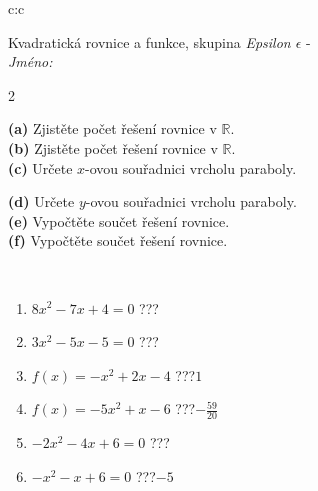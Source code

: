 \documentclass[10pt]{report}
\begin{document}
\begin{tabular}{c:c}
\begin{minipage}[c][104.5mm][t]{0.5\linewidth}
\begin{center}
\vspace{7mm}
{\huge \LARGE Kvadratická rovnice a funkce, skupina \textit{Epsilon $\epsilon$} -}\\[5mm]
\textit{Jméno:}\phantom{xxxxxxxxxxxxxxxxxxxxxxxxxxxxxxxxxxxxxxxxxxxxxxxxxxxxxxxxxxxxxxxxx}\\[5mm]
\begin{minipage}{0.95\linewidth}
\begin{center}
{\small \begin{multicols}{2} \raggedright
\textbf{(a)} Zjistěte počet řešení rovnice v \(\mathbb{R}\). \\[1mm]
\textbf{(b)} Zjistěte počet řešení rovnice v \(\mathbb{R}\). \\[1mm]
\textbf{(c)} Určete \(x\)-ovou souřadnici vrcholu paraboly. \par \columnbreak
\textbf{(d)} Určete \(y\)-ovou souřadnici vrcholu paraboly. \\[1mm]
\textbf{(e)} Vypočtěte součet řešení rovnice. \\[1mm]
\textbf{(f)} Vypočtěte součet řešení rovnice.
\end{multicols}
}
\end{center}
\end{minipage}
\\[4mm]
\begin{minipage}{0.79\linewidth}
\begin{center}
\begin{varwidth}{\linewidth}
\begin{enumerate}
\Large
\item $8x^2-7x+4=0$\quad \dotfill\; ???\;\dotfill {}
\item $3x^2-5x-5=0$\quad \dotfill\; ???\;\dotfill {}
\item $f(x)=-x^2+2x-4$\quad \dotfill\; ???\;\dotfill \quad $1$
\item $f(x)=-5x^2+x-6$\quad \dotfill\; ???\;\dotfill \quad $-\frac{59}{20}$
\item $-2x^2-4x+6=0$\quad \dotfill\; ???\;\dotfill {}
\item $-x^2-x+6=0$\quad \dotfill\; ???\;\dotfill \quad $-5$
\end{enumerate}
\end{varwidth}
\end{center}
\end{minipage}

\end{center}
\end{minipage}
\end{tabular}
\end{document}
